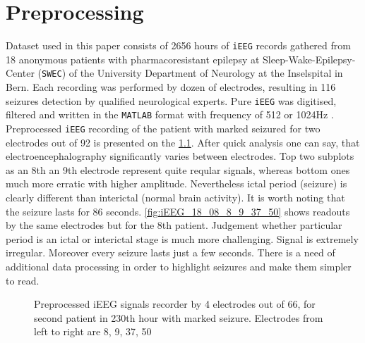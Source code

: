 \chapter{Preprocessing}
\endgroup
Dataset used in this paper consists of 2656 hours of \verb|iEEG| records gathered from 18 anonymous patients with pharmacoresistant epilepsy at Sleep-Wake-Epilepsy-Center (\verb|SWEC|) of the University Department of Neurology at the Inselspital in Bern. Each recording was performed by dozen of electrodes, resulting in 116 seizures detection by qualified neurological experts. Pure \verb|iEEG| was digitised, filtered and written in the \verb|MATLAB| format with frequency of 512 or 1024Hz \cite{epilepsy_db}. Preprocessed \verb|iEEG| recording of the patient with marked seizured for two electrodes out of 92 is presented on the \figurename{} \ref{fig:iEEG_230_02_8_9_37_50}. After quick analysis one can say, that electroencephalography significantly varies between electrodes. Top two subplots as an 8th an 9th electrode represent quite reqular signals, whereas bottom ones much more erratic with higher amplitude. Nevertheless ictal period (seizure) is clearly different than interictal (normal brain activity). It is worth noting that the seizure lasts for 86 seconds. 
\figurename{} \ref{fig:iEEG_18_08_8_9_37_50} shows readouts by the same electrodes but for the 8th patient. Judgement whether particular period is an ictal or interictal stage is much more challenging. Signal is extremely irregular. Moreover every seizure lasts just a few seconds. There is a need of additional data processing in order to highlight seizures and make them simpler to read.

\begin{figure}[H]
	\begin{center}
	\end{center}
	\caption{Preprocessed iEEG signals recorder by 4 electrodes out of 66, for second patient in 230th hour with marked seizure. Electrodes from left to right are 8, 9, 37, 50}

	\label{fig:iEEG_230_02_8_9_37_50}
\end{figure}

